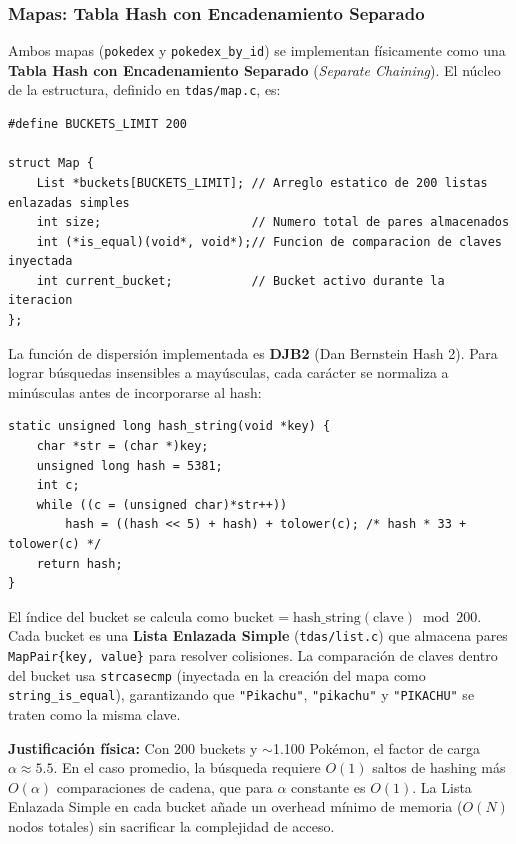 \documentclass[12pt, letterpaper]{article}
\begin{document}
\subsubsection{Mapas: Tabla Hash con Encadenamiento Separado}

Ambos mapas (\texttt{pokedex} y \texttt{pokedex\_by\_id}) se implementan físicamente como una \textbf{Tabla Hash con Encadenamiento Separado} (\emph{Separate Chaining}). El núcleo de la estructura, definido en \texttt{tdas/map.c}, es:

\begin{lstlisting}[caption={Estructura interna de la Tabla Hash en \texttt{tdas/map.c}}]
#define BUCKETS_LIMIT 200

struct Map {
    List *buckets[BUCKETS_LIMIT]; // Arreglo estatico de 200 listas enlazadas simples
    int size;                     // Numero total de pares almacenados
    int (*is_equal)(void*, void*);// Funcion de comparacion de claves inyectada
    int current_bucket;           // Bucket activo durante la iteracion
};
\end{lstlisting}

La función de dispersión implementada es \textbf{DJB2} (Dan Bernstein Hash 2). Para lograr búsquedas insensibles a mayúsculas, cada carácter se normaliza a minúsculas antes de incorporarse al hash:

\begin{lstlisting}[caption={Función de hash DJB2 con normalización a minúsculas en \texttt{tdas/map.c}}]
static unsigned long hash_string(void *key) {
    char *str = (char *)key;
    unsigned long hash = 5381;
    int c;
    while ((c = (unsigned char)*str++))
        hash = ((hash << 5) + hash) + tolower(c); /* hash * 33 + tolower(c) */
    return hash;
}
\end{lstlisting}

El índice del bucket se calcula como $\text{bucket} = \text{hash\_string}(\text{clave}) \bmod 200$. Cada bucket es una \textbf{Lista Enlazada Simple} (\texttt{tdas/list.c}) que almacena pares \texttt{MapPair\{key, value\}} para resolver colisiones. La comparación de claves dentro del bucket usa \texttt{strcasecmp} (inyectada en la creación del mapa como \texttt{string\_is\_equal}), garantizando que \texttt{"Pikachu"}, \texttt{"pikachu"} y \texttt{"PIKACHU"} se traten como la misma clave.

\textbf{Justificación física:} Con 200 buckets y $\sim$1.100 Pokémon, el factor de carga $\alpha \approx 5.5$. En el caso promedio, la búsqueda requiere $O(1)$ saltos de hashing más $O(\alpha)$ comparaciones de cadena, que para $\alpha$ constante es $O(1)$. La Lista Enlazada Simple en cada bucket añade un overhead mínimo de memoria ($O(N)$ nodos totales) sin sacrificar la complejidad de acceso.
\end{document}
